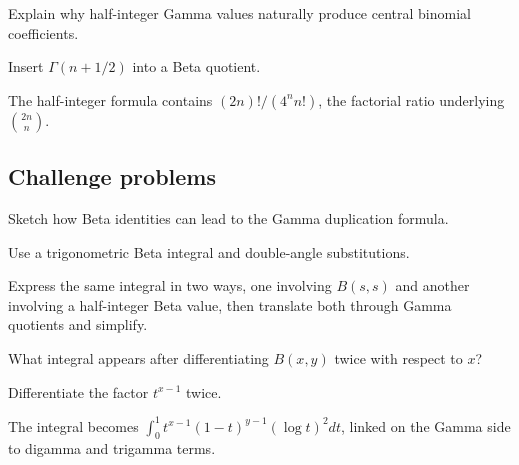 \begin{exercise}\label{exr:iv20-expand-14}
Explain why half-integer Gamma values naturally produce central binomial coefficients.
\end{exercise}
\begin{hint}
Insert \(\Gamma(n+1/2)\) into a Beta quotient.
\end{hint}
\begin{solution}
The half-integer formula contains \((2n)!/(4^n n!)\), the factorial ratio underlying \(\binom{2n}{n}\).
\end{solution}

\subsection*{Challenge problems}

\begin{exercise}\label{exr:iv20-expand-15}
Sketch how Beta identities can lead to the Gamma duplication formula.
\end{exercise}
\begin{hint}
Use a trigonometric Beta integral and double-angle substitutions.
\end{hint}
\begin{solution}
Express the same integral in two ways, one involving \(B(s,s)\) and another involving a half-integer Beta value, then translate both through Gamma quotients and simplify.
\end{solution}

\begin{exercise}\label{exr:iv20-expand-16}
What integral appears after differentiating \(B(x,y)\) twice with respect to \(x\)?
\end{exercise}
\begin{hint}
Differentiate the factor \(t^{x-1}\) twice.
\end{hint}
\begin{solution}
The integral becomes \(\int_0^1 t^{x-1}(1-t)^{y-1}(\log t)^2dt\), linked on the Gamma side to digamma and trigamma terms.
\end{solution}

